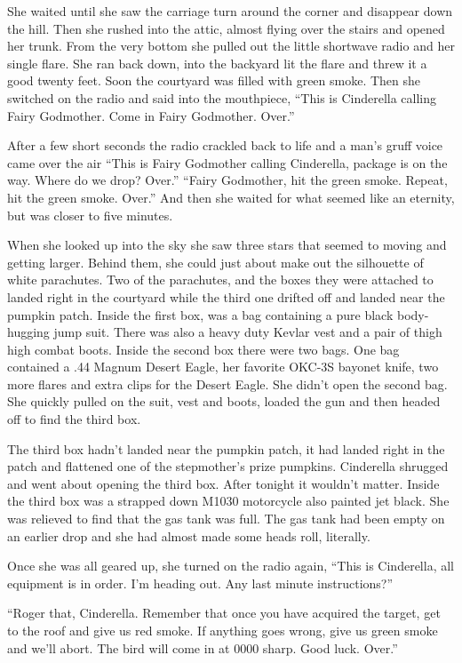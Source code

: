 \documentclass[11pt,letterpaper]{article}
\begin{document}
She waited until she saw the carriage turn around the corner and disappear down the hill. Then she rushed into the attic, almost flying over the stairs and opened her trunk. From the very bottom she pulled out the little shortwave radio and her single flare. She ran back down, into the backyard lit the flare and threw it a good twenty feet. Soon the courtyard was filled with green smoke. Then she switched on the radio and said into the mouthpiece, ``This is Cinderella calling Fairy Godmother. Come in Fairy Godmother. Over.''

After a few short seconds the radio crackled back to life and a man's gruff voice came over the air ``This is Fairy Godmother calling Cinderella, package is on the way. Where do we drop? Over.'' ``Fairy Godmother, hit the green smoke. Repeat, hit the green smoke. Over.'' And then she waited for what seemed like an eternity, but was closer to five minutes.

When she looked up into the sky she saw three stars that seemed to moving and getting larger. Behind them, she could just about make out the silhouette of white parachutes. Two of the parachutes, and the boxes they were attached to landed right in the courtyard while the third one drifted off and landed near the pumpkin patch. Inside the first box, was a bag containing a pure black body-hugging jump suit. There was also a heavy duty Kevlar vest and a pair of thigh high combat boots. Inside the second box there were two bags. One bag contained a .44 Magnum Desert Eagle, her favorite OKC-3S bayonet knife, two more flares and extra clips for the Desert Eagle. She didn't open the second bag. She quickly pulled on the suit, vest and boots, loaded the gun and then headed off to find the third box.

The third box hadn't landed near the pumpkin patch, it had landed right in the patch and flattened one of the stepmother's prize pumpkins. Cinderella shrugged and went about opening the third box. After tonight it wouldn't matter. Inside the third box was a strapped down M1030 motorcycle also painted jet black. She was relieved to find that the gas tank was full. The gas tank had been empty on an earlier drop and she had almost made some heads roll, literally.

Once she was all geared up, she turned on the radio again, ``This is Cinderella, all equipment is in order. I'm heading out. Any last minute instructions?''

``Roger that, Cinderella. Remember that once you have acquired the target, get to the roof and give us red smoke. If anything goes wrong, give us green smoke and we'll abort. The bird will come in at 0000 sharp. Good luck. Over.''
\end{document}
